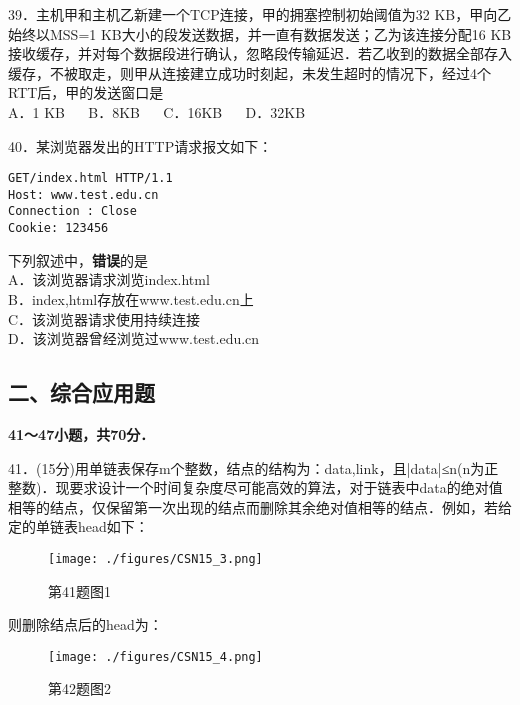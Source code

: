 39．主机甲和主机乙新建一个TCP连接，甲的拥塞控制初始阈值为32 KB，甲向乙始终以MSS=1 KB大小的段发送数据，并一直有数据发送；乙为该连接分配16 KB接收缓存，并对每个数据段进行确认，忽略段传输延迟．若乙收到的数据全部存入缓存，不被取走，则甲从连接建立成功时刻起，未发生超时的情况下，经过4个RTT后，甲的发送窗口是 \\
A．1 KB $\quad$ B．8KB $\quad$ C．16KB $\quad$ D．32KB

40．某浏览器发出的HTTP请求报文如下： \\
\begin{lstlisting}
GET/index.html HTTP/1.1
Host: www.test.edu.cn
Connection : Close
Cookie: 123456
\end{lstlisting}
下列叙述中，\textbf{错误}的是 \\
A．该浏览器请求浏览index.html \\
B．index,html存放在www.test.edu.cn上 \\
C．该浏览器请求使用持续连接 \\
D．该浏览器曾经浏览过www.test.edu.cn

\subsection{二、综合应用题}
\textbf{41～47小题，共70分．}

41．(15分)用单链表保存m个整数，结点的结构为：data,link，且|data|≤n(n为正整数)．现要求设计一个时间复杂度尽可能高效的算法，对于链表中data的绝对值相等的结点，仅保留第一次出现的结点而删除其余绝对值相等的结点．例如，若给定的单链表head如下：
\begin{figure}[ht]
\centering
\texttt{[image: ./figures/CSN15\_3.png]}
\caption{第41题图1} \label{CSN15_fig3}
\end{figure}
则删除结点后的head为：
\begin{figure}[ht]
\centering
\texttt{[image: ./figures/CSN15\_4.png]}
\caption{第42题图2} \label{CSN15_fig4}
\end{figure}
